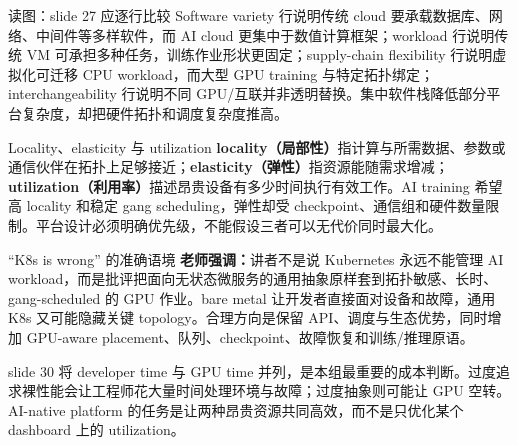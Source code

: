 
\begin{knowledgebox}{读图：slide 27 应逐行比较}
Software variety 行说明传统 cloud 要承载数据库、网络、中间件等多样软件，而 AI cloud 更集中于数值计算框架；workload 行说明传统 VM 可承担多种任务，训练作业形状更固定；supply-chain flexibility 行说明虚拟化可迁移 CPU workload，而大型 GPU training 与特定拓扑绑定；interchangeability 行说明不同 GPU/互联并非透明替换。集中软件栈降低部分平台复杂度，却把硬件拓扑和调度复杂度推高。
\end{knowledgebox}

\begin{importantbox}{Locality、elasticity 与 utilization}
\textbf{locality（局部性）}指计算与所需数据、参数或通信伙伴在拓扑上足够接近；\textbf{elasticity（弹性）}指资源能随需求增减；\textbf{utilization（利用率）}描述昂贵设备有多少时间执行有效工作。AI training 希望高 locality 和稳定 gang scheduling，弹性却受 checkpoint、通信组和硬件数量限制。平台设计必须明确优先级，不能假设三者可以无代价同时最大化。
\end{importantbox}

\begin{warningbox}{“K8s is wrong” 的准确语境}
\textbf{老师强调：}讲者不是说 Kubernetes 永远不能管理 AI workload，而是批评把面向无状态微服务的通用抽象原样套到拓扑敏感、长时、gang-scheduled 的 GPU 作业。bare metal 让开发者直接面对设备和故障，通用 K8s 又可能隐藏关键 topology。合理方向是保留 API、调度与生态优势，同时增加 GPU-aware placement、队列、checkpoint、故障恢复和训练/推理原语。
\end{warningbox}

slide 30 将 developer time 与 GPU time 并列，是本组最重要的成本判断。过度追求裸性能会让工程师花大量时间处理环境与故障；过度抽象则可能让 GPU 空转。AI-native platform 的任务是让两种昂贵资源共同高效，而不是只优化某个 dashboard 上的 utilization。


